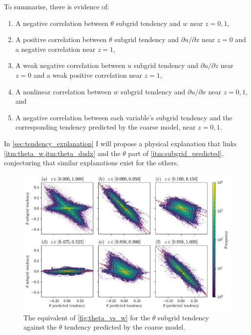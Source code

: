 \documentclass[../main.tex]{subfiles}
\begin{document}
To summarise, there is evidence of:
\begin{enumerate}
    \item\label{itm:theta_w} A negative correlation between $\theta$ subgrid
        tendency and $w$ near $z=0,1$,
    \item\label{itm:theta_dudx} A positive correlation between $\theta$ subgrid
        tendency and $\partial u/\partial x$ near $z=0$ and a negative
        correlation near $z=1$,
    \item\label{itm:u_dudz} A weak negative correlation between $u$ subgrid
        tendency and $\partial u/\partial z$ near $z=0$ and a weak positive
        correlation near $z=1$,
    \item\label{itm:w_dudx} A nonlinear correlation between $w$ subgrid tendency and
        $\partial u/\partial x$ near $z=0,1$, and
    \item\label{itm:subgrid_predicted} A negative correlation between each
        variable's subgrid tendency and the corresponding tendency predicted by
        the coarse model, near $z=0,1$.
\end{enumerate}
In \cref{sec:tendency_explanation} I will propose a physical explanation that
links \cref{itm:theta_w,itm:theta_dudx} and the $\theta$ part of
\cref{itm:subgrid_predicted}, conjecturing that similar explanations exist
for the others.

\begin{figure}[ht]
    \centering
    \includegraphics[width=0.95\linewidth]{figures/theta_subgrid_vs_pred_tend.pdf}
    \caption{
        The equivalent of \cref{fig:theta_vs_w} for the $\theta$ subgrid
        tendency against the $\theta$ tendency predicted by the coarse model.
    }
    \label{fig:theta_subgrid_vs_pred_tend}
\end{figure}
\end{document}
